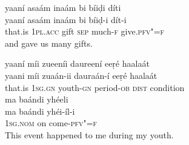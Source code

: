 \begin{exe}
\ex
\label{ex:26}
\glll yaaní	asaám	inaám	bi	bíiḍi	díti \\
yaaní	asaám	inaám	bi	bíiḍ-i	dít-i \\
that.is	\textsc{1pl.acc}	gift \textsc{sep}	much-\textsc{f}	give.\textsc{pfv"=f} \\
\glt and gave us many gifts.

\ex
\label{ex:27}
\glll yaaní	míi	zueeníi	daureení	eeṛé	haalaát\\
yaani	míi	zuaán-ii	dauraán-í	eeṛé	haalaát\\
that.is	\textsc{1sg.gn}	youth-\textsc{gn}	period-\textsc{ob}	\textsc{dist}	condition\\
\glll ma	baándi	yhéeli\\
ma	baándi	yhéi-íl-i\\
\textsc{1sg.nom}	on	come-\textsc{pfv"=f}\\
\glt This event happened to me during my youth.

\end{exe}